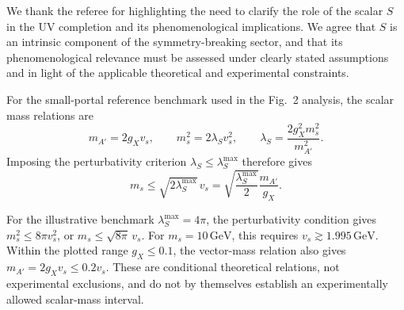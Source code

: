 \documentclass[12pt,a4paper]{article}
\begin{document}
We thank the referee for highlighting the need to clarify the role of the scalar \(S\) in the UV completion and its phenomenological implications. We agree that \(S\) is an intrinsic component of the symmetry-breaking sector, and that its phenomenological relevance must be assessed under clearly stated assumptions and in light of the applicable theoretical and experimental constraints.

For the small-portal reference benchmark used in the Fig.~2 analysis, the scalar mass relations are
\[
m_{A'}=2g_Xv_s,\qquad m_s^2=2\lambda_Sv_s^2,
\qquad
\lambda_S=\frac{2g_X^2m_s^2}{m_{A'}^2}.
\]
Imposing the perturbativity criterion \(\lambda_S\leq\lambda_S^{\max}\) therefore gives
\[
m_s\leq\sqrt{2\lambda_S^{\max}}\,v_s
=\sqrt{\frac{\lambda_S^{\max}}{2}}\frac{m_{A'}}{g_X}.
\]

For the illustrative benchmark \(\lambda_S^{\max}=4\pi\), the perturbativity condition gives \(m_s^2\leq8\pi v_s^2\), or \(m_s\leq\sqrt{8\pi}\,v_s\). For \(m_s=10\,\mathrm{GeV}\), this requires \(v_s\gtrsim1.995\,\mathrm{GeV}\). Within the plotted range \(g_X\leq0.1\), the vector-mass relation also gives \(m_{A'}=2g_Xv_s\leq0.2v_s\). These are conditional theoretical relations, not experimental exclusions, and do not by themselves establish an experimentally allowed scalar-mass interval.
\end{document}
